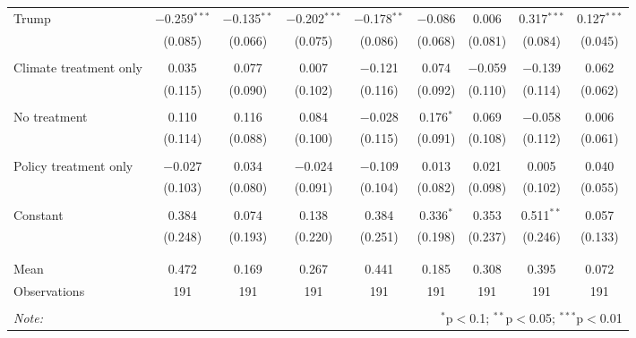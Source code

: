\begin{tabular}{@{\extracolsep{5pt}}lcccccccc}
 Trump & $-$0.259$^{***}$ & $-$0.135$^{**}$ & $-$0.202$^{***}$ & $-$0.178$^{**}$ & $-$0.086 & 0.006 & 0.317$^{***}$ & 0.127$^{***}$ \\ 
  & (0.085) & (0.066) & (0.075) & (0.086) & (0.068) & (0.081) & (0.084) & (0.045) \\ 
  & & & & & & & & \\ 
 Climate treatment only & 0.035 & 0.077 & 0.007 & $-$0.121 & 0.074 & $-$0.059 & $-$0.139 & 0.062 \\ 
  & (0.115) & (0.090) & (0.102) & (0.116) & (0.092) & (0.110) & (0.114) & (0.062) \\ 
  & & & & & & & & \\ 
 No treatment & 0.110 & 0.116 & 0.084 & $-$0.028 & 0.176$^{*}$ & 0.069 & $-$0.058 & 0.006 \\ 
  & (0.114) & (0.088) & (0.100) & (0.115) & (0.091) & (0.108) & (0.112) & (0.061) \\ 
  & & & & & & & & \\ 
 Policy treatment only & $-$0.027 & 0.034 & $-$0.024 & $-$0.109 & 0.013 & 0.021 & 0.005 & 0.040 \\ 
  & (0.103) & (0.080) & (0.091) & (0.104) & (0.082) & (0.098) & (0.102) & (0.055) \\ 
  & & & & & & & & \\ 
 Constant & 0.384 & 0.074 & 0.138 & 0.384 & 0.336$^{*}$ & 0.353 & 0.511$^{**}$ & 0.057 \\ 
  & (0.248) & (0.193) & (0.220) & (0.251) & (0.198) & (0.237) & (0.246) & (0.133) \\ 
  & & & & & & & & \\ 
\hline \\[-1.8ex] 
Mean & 0.472 & 0.169 & 0.267 & 0.441 & 0.185 & 0.308 & 0.395 & 0.072 \\ 
Observations & 191 & 191 & 191 & 191 & 191 & 191 & 191 & 191 \\ 
\hline 
\hline \\[-1.8ex] 
\textit{Note:}  & \multicolumn{8}{r}{$^{*}$p$<$0.1; $^{**}$p$<$0.05; $^{***}$p$<$0.01} \\ 
\end{tabular} 
